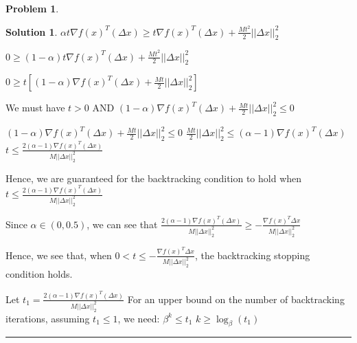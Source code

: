 \documentclass{article}
\theoremstyle{definition}
\newtheorem{problem}{Problem}
\def\fline{\rule{0.75\linewidth}{0.5pt}}
\newcommand{\finishline}{\begin{center}\fline\end{center}}
\newtheorem*{solution*}{Solution}
\newenvironment{solution}{\begin{solution*}}{{\finishline} \end{solution*}}
\begin{document}
\begin{problem}
\begin{solution}
$\alpha t\nabla f(x)^T (\Delta x) \geq t\nabla f(x)^T (\Delta x) + \frac{Mt^2}{2} ||\Delta x||^2_2$

$0 \geq (1 - \alpha) t \nabla f(x)^T (\Delta x) + \frac{Mt^2}{2} ||\Delta x||^2_2$

$0 \geq t[(1 - \alpha) \nabla f(x)^T (\Delta x) + \frac{Mt}{2} ||\Delta x||^2_2]$

We must have $t > 0$ AND $(1 - \alpha) \nabla f(x)^T (\Delta x) + \frac{Mt}{2} ||\Delta x||^2_2 \leq 0$

$(1 - \alpha) \nabla f(x)^T (\Delta x) + \frac{Mt}{2} ||\Delta x||^2_2 \leq 0$ \newline 
$\frac{Mt}{2} ||\Delta x||^2_2 \leq (\alpha - 1) \nabla f(x)^T (\Delta x)$ \newline 
$t \leq \frac{2(\alpha - 1) \nabla f(x)^T (\Delta x)}{M||\Delta x||^2_2}$ \newline 

Hence, we are guaranteed for the backtracking condition to hold when $t \leq \frac{2(\alpha - 1) \nabla f(x)^T (\Delta x)}{M||\Delta x||^2_2}$ \newline 

Since $\alpha \in (0, 0.5)$, we can see that $\frac{2(\alpha - 1) \nabla f(x)^T (\Delta x)}{M||\Delta x||^2_2} \geq -\frac{\nabla f(x)^T \Delta x}{M ||\Delta x||^2_2}$ \newline 

Hence, we see that, when $0 < t \leq -\frac{\nabla f(x)^T \Delta x}{M ||\Delta x||^2_2}$, the backtracking stopping condition holds. 

Let $t_1 = \frac{2(\alpha - 1) \nabla f(x)^T (\Delta x)}{M||\Delta x||^2_2}$ \newline
For an upper bound on the number of backtracking iterations, assuming $t_1 \leq 1 $, we need: \newline 
$\beta^k \leq t_1$ \newline
$k \geq \log _{\beta}(t_1)$ \newline

\end{solution}
\end{problem}
\end{document}
